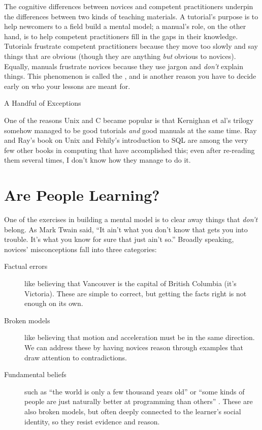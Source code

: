 The cognitive differences between novices and competent practitioners
underpin the differences between two kinds of teaching materials. A
tutorial's purpose is to help newcomers to a field build a mental
model; a manual's role, on the other hand, is to help competent
practitioners fill in the gaps in their knowledge.  Tutorials
frustrate competent practitioners because they move too slowly and say
things that are obvious (though they are anything \emph{but} obvious
to novices). Equally, manuals frustrate novices because they use
jargon and \emph{don't} explain things.  This phenomenon is called the
\cite{Kaly2003}, and is another reason you have to decide early on who
your lessons are meant for.

\begin{callout}{A Handful of Exceptions}

  One of the reasons Unix and C became popular is that Kernighan et
  al's trilogy \cite{Kern1978,Kern1983,Kern1988} somehow managed to be
  good tutorials \emph{and} good manuals at the same time.  Ray and
  Ray's book on Unix \cite{Ray2014} and Fehily's introduction to SQL
  \cite{Fehi2008} are among the very few other books in computing that
  have accomplished this; even after re-reading them several times, I
  don't know how they manage to do it.

\end{callout}

\section{Are People Learning?}\label{s:models-formative-assessment}

One of the exercises in building a mental model is to clear away
things that \emph{don't} belong. As Mark Twain said, ``It ain't what
you don't know that gets you into trouble. It's what you know for sure
that just ain't so.''  Broadly speaking, novices' misconceptions fall
into three categories:

\begin{description}

  \item[Factual errors] like believing that Vancouver is the
    capital of British Columbia (it's Victoria). These are simple to
    correct, but getting the facts right is not enough on its own.

  \item[Broken models] like believing that motion and acceleration
    must be in the same direction. We can address these by having
    novices reason through examples that draw attention to
    contradictions.

  \item[Fundamental beliefs] such as ``the world is only a few
    thousand years old'' or ``some kinds of people are just naturally
    better at programming than others''
    \cite{Guzd2015b,Pati2016}. These are also broken models, but often
    deeply connected to the learner's social identity, so they resist
    evidence and reason.

\end{description}

